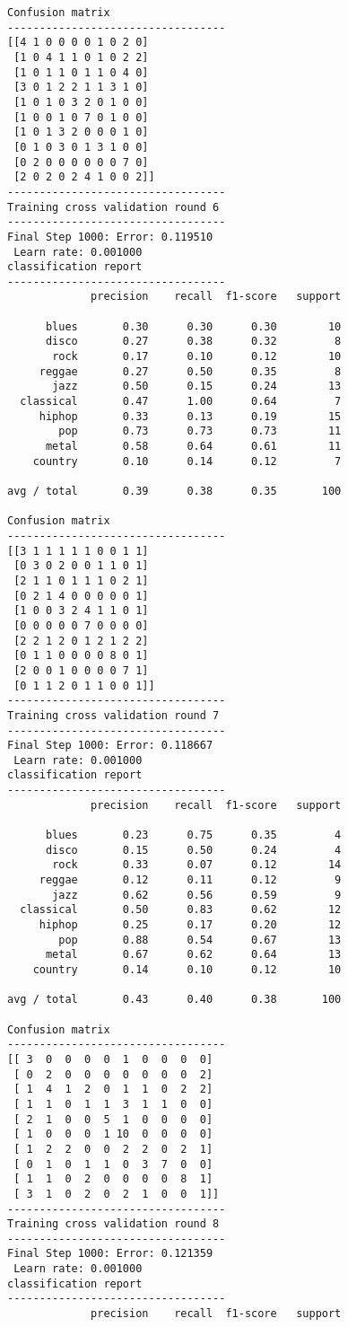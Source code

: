 \documentclass{article}
\begin{document}
\begin{Verbatim}[commandchars=\\\{\}]
Confusion matrix
----------------------------------
[[4 1 0 0 0 0 1 0 2 0]
 [1 0 4 1 1 0 1 0 2 2]
 [1 0 1 1 0 1 1 0 4 0]
 [3 0 1 2 2 1 1 3 1 0]
 [1 0 1 0 3 2 0 1 0 0]
 [1 0 0 1 0 7 0 1 0 0]
 [1 0 1 3 2 0 0 0 1 0]
 [0 1 0 3 0 1 3 1 0 0]
 [0 2 0 0 0 0 0 0 7 0]
 [2 0 2 0 2 4 1 0 0 2]]
----------------------------------
Training cross validation round 6
----------------------------------
Final Step 1000: Error: 0.119510 
 Learn rate: 0.001000
classification report 
----------------------------------
             precision    recall  f1-score   support

      blues       0.30      0.30      0.30        10
      disco       0.27      0.38      0.32         8
       rock       0.17      0.10      0.12        10
     reggae       0.27      0.50      0.35         8
       jazz       0.50      0.15      0.24        13
  classical       0.47      1.00      0.64         7
     hiphop       0.33      0.13      0.19        15
        pop       0.73      0.73      0.73        11
      metal       0.58      0.64      0.61        11
    country       0.10      0.14      0.12         7

avg / total       0.39      0.38      0.35       100

Confusion matrix
----------------------------------
[[3 1 1 1 1 1 0 0 1 1]
 [0 3 0 2 0 0 1 1 0 1]
 [2 1 1 0 1 1 1 0 2 1]
 [0 2 1 4 0 0 0 0 0 1]
 [1 0 0 3 2 4 1 1 0 1]
 [0 0 0 0 0 7 0 0 0 0]
 [2 2 1 2 0 1 2 1 2 2]
 [0 1 1 0 0 0 0 8 0 1]
 [2 0 0 1 0 0 0 0 7 1]
 [0 1 1 2 0 1 1 0 0 1]]
----------------------------------
Training cross validation round 7
----------------------------------
Final Step 1000: Error: 0.118667 
 Learn rate: 0.001000
classification report 
----------------------------------
             precision    recall  f1-score   support

      blues       0.23      0.75      0.35         4
      disco       0.15      0.50      0.24         4
       rock       0.33      0.07      0.12        14
     reggae       0.12      0.11      0.12         9
       jazz       0.62      0.56      0.59         9
  classical       0.50      0.83      0.62        12
     hiphop       0.25      0.17      0.20        12
        pop       0.88      0.54      0.67        13
      metal       0.67      0.62      0.64        13
    country       0.14      0.10      0.12        10

avg / total       0.43      0.40      0.38       100

Confusion matrix
----------------------------------
[[ 3  0  0  0  0  1  0  0  0  0]
 [ 0  2  0  0  0  0  0  0  0  2]
 [ 1  4  1  2  0  1  1  0  2  2]
 [ 1  1  0  1  1  3  1  1  0  0]
 [ 2  1  0  0  5  1  0  0  0  0]
 [ 1  0  0  0  1 10  0  0  0  0]
 [ 1  2  2  0  0  2  2  0  2  1]
 [ 0  1  0  1  1  0  3  7  0  0]
 [ 1  1  0  2  0  0  0  0  8  1]
 [ 3  1  0  2  0  2  1  0  0  1]]
----------------------------------
Training cross validation round 8
----------------------------------
Final Step 1000: Error: 0.121359 
 Learn rate: 0.001000
classification report 
----------------------------------
             precision    recall  f1-score   support


\end{Verbatim}
\end{document}
